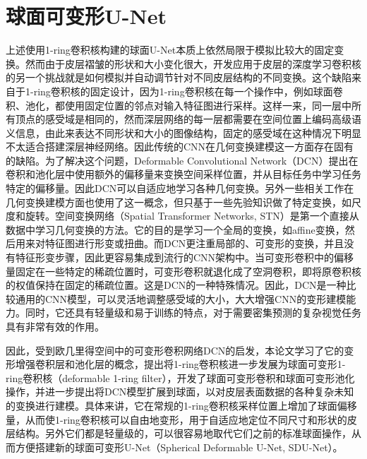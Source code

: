 \section{球面可变形U-Net}
上述使用1-ring卷积核构建的球面U-Net本质上依然局限于模拟比较大的固定变换\cite{dai2017deformable}。然而由于皮层褶皱的形状和大小变化很大，开发应用于皮层的深度学习卷积核的另一个挑战就是如何模拟并自动调节针对不同皮层结构的不同变换。这个缺陷来自于1-ring卷积核的固定设计，因为1-ring卷积核在每一个操作中，例如球面卷积、池化，都使用固定位置的邻点对输入特征图进行采样。这样一来，同一层中所有顶点的感受域是相同的，然而深层网络的每一层都需要在空间位置上编码高级语义信息，由此来表达不同形状和大小的图像结构，固定的感受域在这种情况下明显不太适合搭建深层神经网络。因此传统的CNN在几何变换建模这一方面存在固有的缺陷。为了解决这个问题，Deformable Convolutional Network（DCN）\cite{dai2017deformable}提出在卷积和池化层中使用额外的偏移量来变换空间采样位置，并从目标任务中学习任务特定的偏移量。因此DCN可以自适应地学习各种几何变换。另外一些相关工作在几何变换建模方面也使用了这一概念，但只基于一些先验知识做了特定变换，如尺度\cite{xu2014scale}和旋转\cite{worrall2017harmonic}。空间变换网络（Spatial Transformer Networks, STN）\cite{jaderberg2015spatial}是第一个直接从数据中学习几何变换的方法。它的目的是学习一个全局的变换，如affine变换，然后用来对特征图进行形变或扭曲。而DCN更注重局部的、可变形的变换，并且没有特征形变步骤，因此更容易集成到流行的CNN架构中。当可变形卷积中的偏移量固定在一些特定的稀疏位置时，可变形卷积就退化成了空洞卷积\cite{chen2017rethinking}，即将原卷积核的权值保持在固定的稀疏位置。这是DCN的一种特殊情况。因此，DCN是一种比较通用的CNN模型，可以灵活地调整感受域的大小，大大增强CNN的变形建模能力。同时，它还具有轻量级和易于训练的特点，对于需要密集预测的复杂视觉任务具有非常有效的作用\cite{dai2017deformable}。

因此，受到欧几里得空间中的可变形卷积网络DCN\cite{dai2017deformable}的启发，本论文学习了它的变形增强卷积层和池化层的概念，提出将1-ring卷积核进一步发展为球面可变形1-ring卷积核（deformable 1-ring filter），开发了球面可变形卷积和球面可变形池化操作，并进一步提出将DCN模型扩展到球面，以对皮层表面数据的各种复杂未知的变换进行建模。具体来讲，它在常规的1-ring卷积核采样位置上增加了球面偏移量，从而使1-ring卷积核可以自由地变形，用于自适应地定位不同尺寸和形状的皮层结构。另外它们都是轻量级的，可以很容易地取代它们之前的标准球面操作，从而方便搭建新的球面可变形U-Net（Spherical Deformable U-Net, SDU-Net）。

